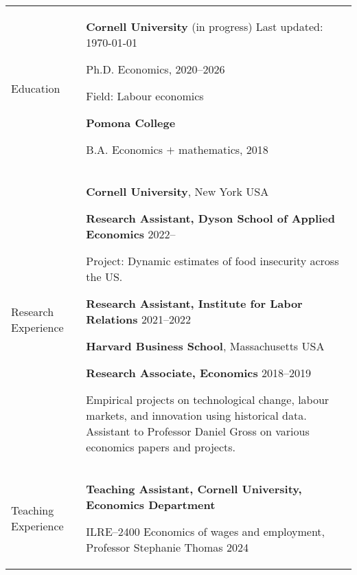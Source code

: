 \documentclass[letterpaper,11pt,oneside]{article}
\begin{document}
\noindent
\begin{tabular}[\textwidth]{p{} p{}}
    \Large{Education}
    & \textbf{Cornell University} (in progress)  \hfill Last updated: \today

    Ph.D. Economics, 2020--2026
    
    Field: Labour economics
    
    \textbf{Pomona College}

    B.A. Economics $+$ mathematics, 2018 \vspace{0.2cm} \\
    
    
    
\Large{Research Experience}
    & \textbf{Cornell University}, New York USA
    
    \textbf{Research Assistant, Dyson School of Applied Economics} \hfill 2022--

    Project: Dynamic estimates of food insecurity across the US.
    
    \textbf{Research Assistant, Institute for Labor Relations} \hfill 2021--2022
    \vspace{0.1cm}

    \textbf{Harvard Business School}, Massachusetts USA
    
    \textbf{Research Associate, Economics} \hfill 2018--2019
    
    Empirical projects on technological change, labour markets, and innovation using historical data.
    Assistant to Professor Daniel Gross on various economics papers and projects.
    \vspace{0.2cm} \\

\Large{Teaching Experience}
    & \textbf{Teaching Assistant, Cornell University, Economics Department}
    
    ILRE--2400 Economics of wages and employment, Professor Stephanie Thomas \hfill 2024


\end{tabular}
\end{document}
